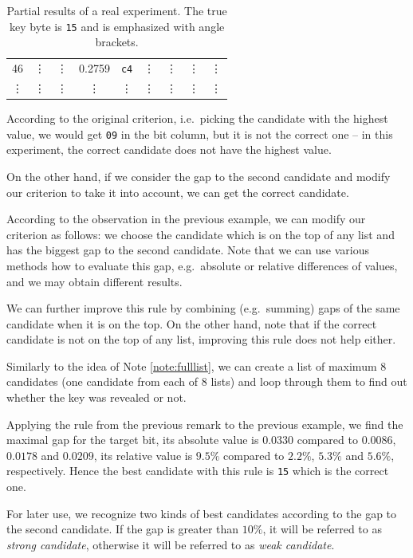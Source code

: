 \begin{example}
\begin{table}[H]
\begin{center}
\begin{tabular}{| c | c | c | c | c | c | c | c | c |}
					46     & \vdots & \vdots     & 0.2759 & {\tt c4}   & \vdots & \vdots     & \vdots & \vdots     \\
					\vdots & \vdots & \vdots     & \vdots & \vdots     & \vdots & \vdots     & \vdots & \vdots     \\
				\hline
			\end{tabular}
			\end{center}
		\caption{Partial results of a real experiment. The true key byte is {\tt 15} and is emphasized with angle brackets.}
		\label{tab:gap}
		\end{table}
		According to the original criterion, i.e.\ picking the candidate with the highest value, we would get {\tt 09} in the  bit column, but it is not the correct one -- in this experiment, the correct candidate does not have the highest value.
		
		On the other hand, if we consider the gap to the second candidate and modify our criterion to take it into account, we can get the correct candidate.
	\end{example}
	
	\begin{remark}
	\label{rem:gap}
		According to the observation in the previous example, we can modify our criterion as follows: we choose the candidate which is on the top of any list and has the biggest gap to the second candidate. Note that we can use various methods how to evaluate this gap, e.g.\ absolute or relative differences of values, and we may obtain different results.
		
		We can further improve this rule by combining (e.g.\ summing) gaps of the same candidate when it is on the top. On the other hand, note that if the correct candidate is not on the top of any list, improving this rule does not help either.
		
		Similarly to the idea of Note \ref{note:fulllist}, we can create a list of maximum $8$ candidates (one candidate from each of $8$ lists) and loop through them to find out whether the key was revealed or not.
	\end{remark}
	
	Applying the rule from the previous remark to the previous example, we find the maximal gap for the  target bit, its absolute value is $0.0330$ compared to $0.0086$, $0.0178$ and $0.0209$, its relative value is $9.5\%$ compared to $2.2\%$, $5.3\%$ and $5.6\%$, respectively. Hence the best candidate with this rule is {\tt 15} which is the correct one.
	
	\begin{note}
	\label{note:strong}
		For later use, we recognize two kinds of best candidates according to the gap to the second candidate. If the gap is greater than $10\%$, it will be referred to as {\em strong candidate}, otherwise it will be referred to as {\em weak candidate}.
	\end{note}